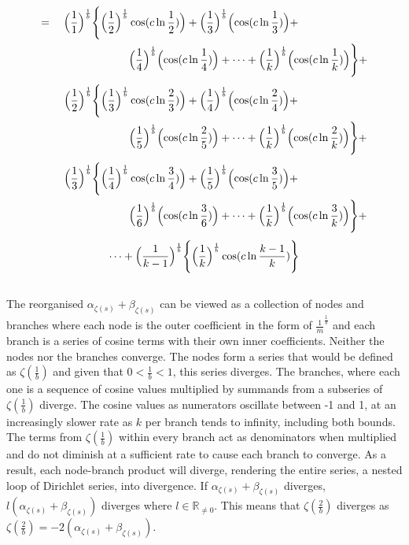 \documentclass{amsart}
\begin{document}
	\[
	\begin{aligned}
		= \quad \Bigl( \frac{1}{1} \Bigr)^\frac1b \Biggl\{ \Bigl( \frac{1}{2} \Bigr)^\frac1b &\cos(c \ln \frac{1}{2}) \Bigr) + \Bigl( \frac{1}{3} \Bigr)^\frac1b \Bigl( \cos(c \ln \frac{1}{3}) \Bigr) + \\
		& \Bigl( \frac{1}{4} \Bigr)^\frac1b \Bigl( \cos(c \ln \frac{1}{4}) \Bigr) + \dots  + \Bigl( \frac{1}{k} \Bigr)^\frac1b \Bigl( \cos(c \ln \frac{1}{k}) \Bigr) \Biggr\} + 
	\end{aligned}
	\]
	\[
	\begin{aligned}
		\quad\quad \Bigl( \frac{1}{2}  \Bigr)^\frac1b \Biggl\{ \Bigl( \frac{1}{3} \Bigr)^\frac1b &\cos(c \ln \frac{2}{3}) \Bigr) + \Bigl( \frac{1}{4} \Bigr)^\frac1b \Bigl( \cos(c \ln \frac{2}{4}) \Bigr) + \\
		& \Bigl( \frac{1}{5} \Bigr)^\frac1b \Bigl( \cos(c \ln \frac{2}{5}) \Bigr) + \dots  + \Bigl( \frac{1}{k} \Bigr)^\frac1b \Bigl( \cos(c \ln \frac{2}{k}) \Bigr) \Biggr\} + 
	\end{aligned}
	\]
	\[
	\begin{aligned}
		\quad\quad \Bigl( \frac{1}{3} \Bigr)^\frac1b \Biggl\{ \Bigl( \frac{1}{4} \Bigr)^\frac1b &\cos(c \ln \frac{3}{4}) \Bigr) + \Bigl( \frac{1}{5} \Bigr)^\frac1b \Bigl( \cos(c \ln \frac{3}{5}) \Bigr) + \\
		& \Bigl( \frac{1}{6} \Bigr)^\frac1b \Bigl( \cos(c \ln \frac{3}{6}) \Bigr) + \dots  + \Bigl( \frac{1}{k} \Bigr)^\frac1b \Bigl( \cos(c \ln \frac{3}{k}) \Bigr) \Biggr\} + 
	\end{aligned}
	\]
	\[ \dots + \Bigl( \frac{1}{k-1} \Bigr)^\frac1b \Biggl\{ \Bigl( \frac{1}{k} \Bigr)^\frac1b \cos(c \ln \frac{k-1}{k}) \Biggr\} \]
	
	
	
	
	\[\]
	
	The reorganised $\alpha_{\zeta(s)} + \beta_{\zeta(s)}$ can be viewed as a collection of nodes and branches where each node is the outer coefficient in the form of $\frac{1}{m}^{\frac{1}{b}}$ and each branch is a series of cosine terms with their own inner coefficients. Neither the nodes nor the branches converge. The nodes form a series that would be defined as $\zeta(\frac{1}{b})$ and given that $0 < \frac{1}{b} < 1$, this series diverges. The branches, where each one is a sequence of cosine values multiplied by summands from a subseries of $\zeta(\frac{1}{b})$ diverge. The cosine values as numerators oscillate between -1 and 1, at an increasingly slower rate as $k$ per branch tends to infinity, including both bounds. The terms from $\zeta(\frac{1}{b})$ within every branch act as denominators when multiplied and do not diminish at a sufficient rate to cause each branch to converge. As a result, each node-branch product will diverge, rendering the entire series, a nested loop of Dirichlet series, into divergence. If $\alpha_{\zeta(s)} + \beta_{\zeta(s)}$ diverges, $l(\alpha_{\zeta(s)} + \beta_{\zeta(s)})$ diverges where $l \in \mathbb{R}_{\neq 0}$. This means that $\zeta(\frac{2}{b})$ diverges as $\zeta(\frac{2}{b}) = -2(\alpha_{\zeta(s)} + \beta_{\zeta(s)})$. 
	
\end{document}
